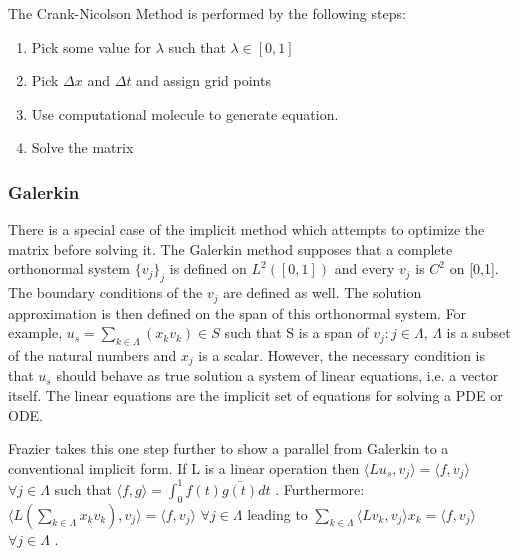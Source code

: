 The Crank-Nicolson Method is performed by the following steps:
\begin{enumerate}
\item Pick some value for $\lambda$ such that $\lambda \in [0,1] $
\item Pick $\Delta x$ and $\Delta t$ and assign grid points
\item Use computational molecule to generate equation.
\item Solve the matrix
\end{enumerate}



\subsubsection {Galerkin}
There is a special case of the implicit method which attempts to optimize the matrix before solving it.  The Galerkin method supposes that a complete orthonormal system $\{v_j\}_j$ is defined on $L^2([0,1])$ and every $v_j$ is $C^2$ on [0,1].  The boundary conditions of the $v_j$ are defined as well.  %
The solution approximation is then defined on the span of this orthonormal system.  For example,
$u_s = \sum_{k\in \Lambda} (x_k v_k )\in S$ such that S is a span of $v_j : j\in \Lambda$, $\Lambda$ is a subset of the natural numbers and $x_j$ is a scalar.  %
However, the necessary condition is that $u_s$ should behave as true solution a system of linear equations, i.e. a vector itself.   The linear equations are %
the implicit set of equations for solving a PDE or ODE.  

Frazier takes this one step further to show a parallel from Galerkin to a conventional implicit form.  If L is a linear operation then %
$\langle L u_s, v_j \rangle = \langle f, v_j \rangle$ $\forall j\in \Lambda$ such that $\langle f, g \rangle = \int ^1 _0 f(t) \bar{g(t)} dt $ .
Furthermore: $\langle L (\sum_{k\in \Lambda} x_k v_k), v_j \rangle = \langle f, v_j \rangle$ $\forall j\in \Lambda$ leading to
$\sum_{k\in \Lambda} \langle L v_k , v_j \rangle x_k = \langle f, v_j \rangle$ $\forall j\in \Lambda$ .

